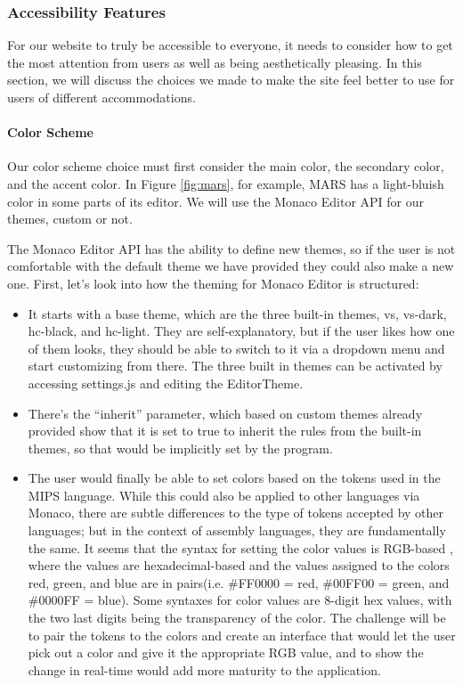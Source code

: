 \documentclass[
    parskip=half,
    fontsize=12pt,
    titlepage=firstiscover,
    toc=bibliography,
    numbers=endperiod
]{scrartcl}
\providecommand{\tightlist}{%
  \setlength{\itemsep}{0pt}\setlength{\parskip}{0pt}}
\begin{document}
\subsubsection{Accessibility Features}
\label{subsec:accessibility-features}

For our website to truly be accessible to everyone, it needs to consider
how to get the most attention from users as well as being aesthetically
pleasing. In this section, we will discuss the choices we made to make
the site feel better to use for users of different accommodations.

\paragraph{Color Scheme}

Our color scheme choice must first consider the main color, the
secondary color, and the accent color. In Figure \ref{fig:mars}, for example, MARS
has a light-bluish color in some parts of its editor. We will use the
Monaco Editor API for our themes, custom or not.

The Monaco Editor API has the ability to define new themes, so if the
user is not comfortable with the default theme we have provided they
could also make a new one. First, let's look into how the theming for
Monaco Editor is structured:

\begin{itemize}
    \tightlist
    \item It starts with a base theme, which are the three built-in themes, vs,
    vs-dark, hc-black, and hc-light. They are self-explanatory, but if the
    user likes how one of them looks, they should be able to switch to it
    via a dropdown menu and start customizing from there. The three built
    in themes can be activated by accessing settings.js and editing the
    EditorTheme.
    \item There's the ``inherit'' parameter, which based on custom themes
    already provided \cite{monaco-themes} show that it is set to true to inherit the rules
    from the built-in themes, so that would be implicitly set by the
    program.
    \item The user would finally be able to set colors based on the tokens used
    in the MIPS language. While this could also be applied to other
    languages via Monaco, there are subtle differences to the type of
    tokens accepted by other languages; but in the context of assembly
    languages, they are fundamentally the same. It seems that the syntax
    for setting the color values is RGB-based \cite{rapidtables-rgb}, where the values are
    hexadecimal-based and the values assigned to the colors red, green,
    and blue are in pairs(i.e. \#FF0000 = red, \#00FF00 = green, and
    \#0000FF = blue). Some syntaxes for color values are 8-digit hex
    values, with the two last digits being the transparency of the color.
    The challenge will be to pair the tokens to the colors and create an
    interface that would let the user pick out a color and give it the
    appropriate RGB value, and to show the change in real-time would add
    more maturity to the application.
\end{itemize}
\end{document}
